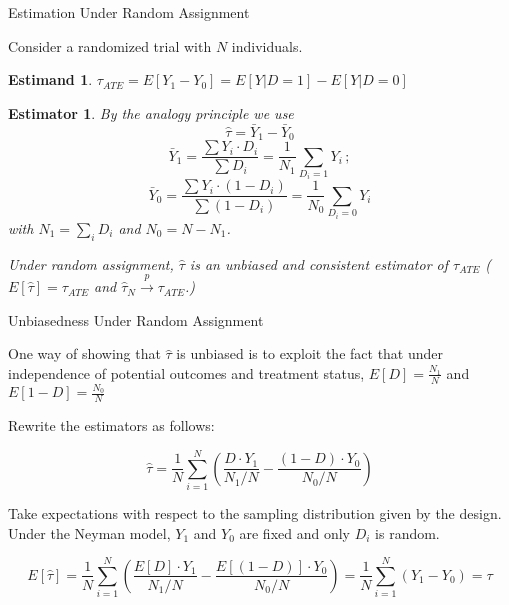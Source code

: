 \documentclass{beamer}
\numberwithin{equation}{section}
\newtheorem{estm}{Estimand}
\newtheorem{esti}{Estimator}
\begin{document}
\begin{frame}{Estimation Under Random Assignment}

Consider a randomized trial with $N$ individuals.

\begin{estm}\small
$\tau_{ATE}=E[Y_1 -Y_0]=E[Y|D=1]-E[Y |D=0]$
\end{estm}

\begin{esti}\small
\pause
By the analogy principle we use\[ \widehat{\tau} = \bar{Y}_1 - \bar{Y}_0 
\]
\[
\bar{Y}_1 = \frac{\sum Y_i\cdot D_i}{\sum D_i}=\frac{1}{N_1}\sum_{D_i=1} Y_i\,;
\]
\[
\bar{Y}_0 = \frac{\sum Y_i\cdot (1-D_i)}{\sum (1-D_i)}=\frac{1}{N_0}\sum_{D_i=0} Y_i
\]
with $N_1 = \sum_i D_i$ and $N_0=N-N_1$.\\\medskip

Under random assignment, $\widehat{\tau}$ is an unbiased and consistent estimator of $\tau_{ATE}$ ($E[\widehat{\tau}]=\tau_{ATE}$ and $\widehat{\tau}_N\stackrel{p}{\rightarrow}\tau_{ATE}$.)


\end{esti}

\end{frame}

\begin{frame}{Unbiasedness Under Random Assignment}

One way of showing that $\widehat{\tau}$ is unbiased is to exploit the
fact that under independence of potential outcomes and treatment status,
$E[D] = \frac{N_1}{N}$ and $E[1 - D] = \frac{N_0}{N}$

\pause

Rewrite the estimators as follows:

\[
\widehat{\tau} =  \frac{1}{N} \sum_{i=1}^N \left (\frac{D \cdot Y_1}{N_1 / N} - \frac{(1 - D) \cdot Y_0}{N_0 / N} \right )
\]

Take expectations with respect to the sampling distribution given by the
design. Under the Neyman model, $Y_1$ and $Y_0$ are fixed
and only $D_i$ is random.

\pause

\[
E[\widehat{\tau}] = \frac{1}{N} \sum_{i=1}^N \left (\frac{E[D] \cdot Y_1}{N_1 / N} - \frac{E[(1 - D)] \cdot Y_0}{N_0 / N} \right ) = \frac{1}{N} \sum_{i=1}^N (Y_1 - Y_0) = \tau
\]

\end{frame}
\end{document}
